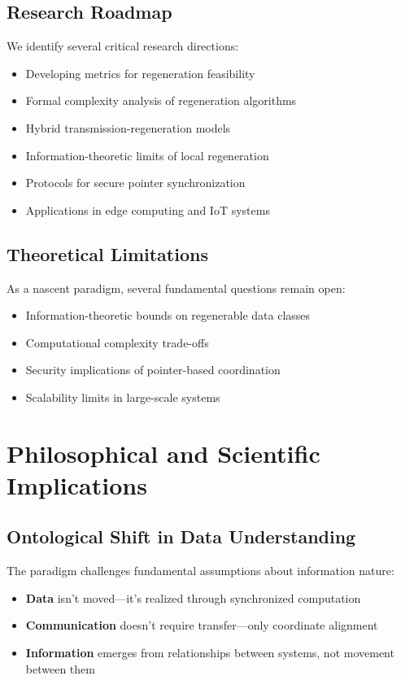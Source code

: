\documentclass[11pt,a4paper]{article}
\begin{document}
\subsection{Research Roadmap}

We identify several critical research directions:
\begin{itemize}
    \item Developing metrics for regeneration feasibility
    \item Formal complexity analysis of regeneration algorithms
    \item Hybrid transmission-regeneration models
    \item Information-theoretic limits of local regeneration
    \item Protocols for secure pointer synchronization
    \item Applications in edge computing and IoT systems
\end{itemize}

\subsection{Theoretical Limitations}

As a nascent paradigm, several fundamental questions remain open:
\begin{itemize}
    \item Information-theoretic bounds on regenerable data classes
    \item Computational complexity trade-offs
    \item Security implications of pointer-based coordination
    \item Scalability limits in large-scale systems
\end{itemize}

\section{Philosophical and Scientific Implications}

\subsection{Ontological Shift in Data Understanding}

The paradigm challenges fundamental assumptions about information nature:

\begin{itemize}
    \item \textbf{Data} isn't moved—it's realized through synchronized computation
    \item \textbf{Communication} doesn't require transfer—only coordinate alignment
    \item \textbf{Information} emerges from relationships between systems, not movement between them
\end{itemize}
\end{document}
